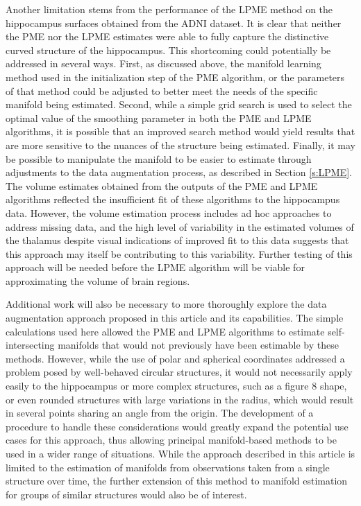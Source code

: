 \documentclass[11pt,reqno]{article}
\theoremstyle{definition}
\begin{document}
Another limitation stems from the performance of the LPME method on the hippocampus surfaces obtained from the ADNI dataset. It is clear that neither the PME nor the LPME estimates were able to fully capture the distinctive curved structure of the hippocampus. This shortcoming could potentially be addressed in several ways. First, as discussed above, the manifold learning method used in the initialization step of the PME algorithm, or the parameters of that method could be adjusted to better meet the needs of the specific manifold being estimated. Second, while a simple grid search is used to select the optimal value of the smoothing parameter in both the PME and LPME algorithms, it is possible that an improved search method would yield results that are more sensitive to the nuances of the structure being estimated. Finally, it may be possible to manipulate the manifold to be easier to estimate through adjustments to the data augmentation process, as described in Section \ref{s:LPME}. The volume estimates obtained from the outputs of the PME and LPME algorithms reflected the insufficient fit of these algorithms to the hippocampus data. However, the volume estimation process includes ad hoc approaches to address missing data, and the high level of variability in the estimated volumes of the thalamus despite visual indications of improved fit to this data suggests that this approach may itself be contributing to this variability. Further testing of this approach will be needed before the LPME algorithm will be viable for approximating the volume of brain regions.

Additional work will also be necessary to more thoroughly explore the data augmentation approach proposed in this article and its capabilities. The simple calculations used here allowed the PME and LPME algorithms to estimate self-intersecting manifolds that would not previously have been estimable by these methods. However, while the use of polar and spherical coordinates addressed a problem posed by well-behaved circular structures, it would not necessarily apply easily to the hippocampus or more complex structures, such as a figure 8 shape, or even rounded structures with large variations in the radius, which would result in several points sharing an angle from the origin. The development of a procedure to handle these considerations would greatly expand the potential use cases for this approach, thus allowing principal manifold-based methods to be used in a wider range of situations. While the approach described in this article is limited to the estimation of manifolds from observations taken from a single structure over time, the further extension of this method to manifold estimation for groups of similar structures would also be of interest.
\end{document}
